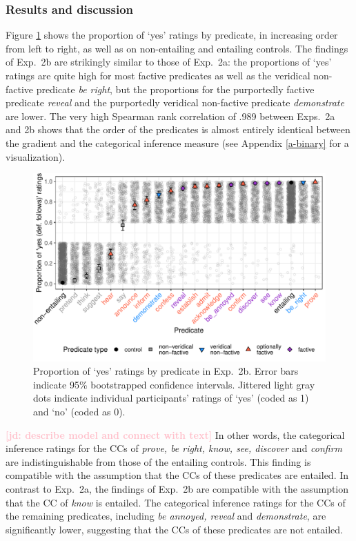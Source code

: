 \documentclass[11pt,fleqn]{article}
\newcommand{\jd}[1]{\textbf{\textcolor{Pink}{[jd: #1]}}}
\newcommand{\6}{\mbox{$[\hspace*{-.6mm}[$}}
\newcommand{\9}{\mbox{$]\hspace*{-.6mm}]$}}
\begin{document}
\subsubsection{Results and discussion}

Figure \ref{fig:2bresults} shows the proportion of `yes' ratings by predicate, in increasing order from left to right, as well as on non-entailing and entailing controls. The findings of Exp.~2b are strikingly similar to those of Exp.~2a: the proportions of `yes' ratings are quite high for most factive predicates as well as the veridical non-factive predicate {\em be right}, but the proportions for the purportedly factive predicate {\em reveal} and the purportedly veridical non-factive predicate {\em demonstrate} are lower. The very high Spearman rank correlation of .989 between Exps.~2a and 2b shows that the order of the predicates is almost entirely identical between the gradient and the categorical inference measure (see Appendix \ref{a-binary} for a visualization). 
 
\begin{figure}[H]
\centering
\includegraphics[width=.7\paperwidth]{../../results/7-veridicality3-binary/graphs/proportion-by-predicate-variability-individual}

\caption{Proportion of `yes' ratings by predicate in Exp.~2b. Error bars indicate 95\% bootstrapped confidence intervals. Jittered light gray dots indicate individual participants' ratings of `yes' (coded as 1) and `no' (coded as 0).}
\label{fig:2bresults}
\end{figure}

\jd{describe model and connect with text} In other words, the categorical inference ratings for the CCs of {\em prove, be right, know, see, discover} and {\em confirm} are indistinguishable from those of the entailing controls. This finding is compatible with the assumption that the CCs of these predicates are entailed. In contrast to Exp.~2a, the findings of Exp.~2b are compatible with the assumption that the CC of {\em know} is entailed. The categorical inference ratings for the CCs of the remaining predicates, including {\em be annoyed, reveal} and {\em demonstrate}, are significantly lower, suggesting that the CCs of these predicates are not entailed.
\end{document}
